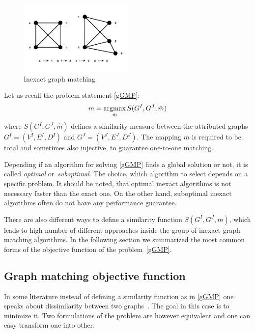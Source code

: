 \vspace{-12pt}
\begin{figure}[htb]
	\centering
	\includegraphics[width=0.5\textwidth]{chapter1/fig/inexactGM}
    \caption{Inexact graph matching}
    \label{fig:inexact_GM}
\end{figure}
\vspace{-10pt}
Let us recall the problem statement \eqref{gGMP}: 
\begin{equation*}
m = \mathop{\rm argmax}_{\hat{m}}S(G^I, G^J, \hat{m})
\end{equation*}
where $S(G^I, G^J, \hat{m})$ defines a similarity measure between the attributed graphs $G^I = (V^I, E^I,D^I)$ and $G^J = (V^J, E^J,D^J)$. The mapping $m$ is required to be total and sometimes also injective, to guarantee one-to-one matching.

Depending if an algorithm for solving \eqref{gGMP} finds a global solution or not, it is called \emph{optimal} or~\emph{suboptimal}. The choice, which algorithm to select depends on a specific problem. It should be noted, that optimal inexact algorithms is not necessary faster than the exact one. On the other hand, suboptimal inexact algorithms often do not have any performance guarantee.

There are also different ways to define a similarity function $S(G^I,G^J,m)$, which leads to high number of different approaches inside the group of inexact graph matching algorithms. In the following section we summarized the most common forms of the objective function of the problem~\eqref{gGMP}.
\subsection{Graph matching objective function}
In some literature instead of defining a similarity function as in \eqref{gGMP} one speaks about dissimilarity between two graphs~\cite{Herault1990_SimulatedAnnealing,FastPFP,Lyzinski2015,Roth2001,Vogelstein_BrainGraphs,Zazlavskiy2008_PATH}. The goal in this case is to minimize it. Two formulations of the problem are however equivalent and one can easy transform one into other.
